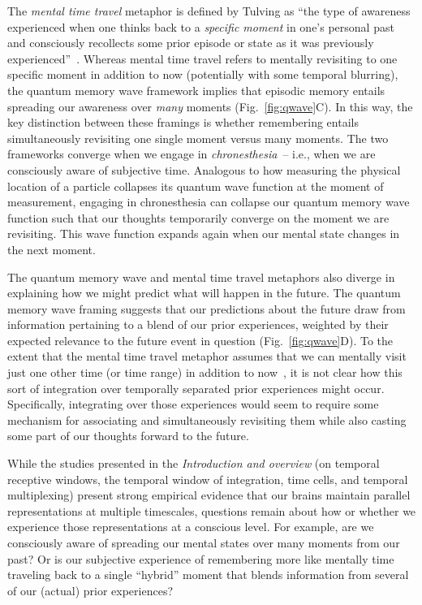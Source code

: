 \documentclass{article}
\begin{document}
The \textit{mental time travel} metaphor is defined by Tulving as ``the type of awareness experienced when one thinks back to a \textit{specific moment} in one's personal past and consciously recollects some prior episode or state as it was previously experienced''~\citep[Fig.~\ref{fig:qwave}B;][emphasis added]{WheeEtal97}.  Whereas mental time travel refers to mentally revisiting to one specific moment in addition to now (potentially with some temporal blurring), the quantum memory wave framework implies that episodic memory entails spreading our awareness over \textit{many} moments (Fig.~\ref{fig:qwave}C).  In this way, the key distinction between these framings is whether remembering entails simultaneously revisiting one single moment versus many moments.  The two frameworks converge when we engage in \textit{chronesthesia}~\citep{Tulv02b}-- i.e., when we are consciously aware of subjective time.   Analogous to how measuring the physical location of a particle collapses its quantum wave function at the moment of measurement, engaging in chronesthesia can collapse our quantum memory wave function such that our thoughts temporarily converge on the moment we are revisiting.  This wave function expands again when our mental state changes in the next moment.

The quantum memory wave and mental time travel metaphors also diverge in explaining how we might predict what will happen in the future.  The quantum memory wave framing suggests that our predictions about the future draw from information pertaining to a blend of our prior experiences, weighted by their expected relevance to the future event in question (Fig.~\ref{fig:qwave}D).  To the extent that the mental time travel metaphor assumes that we can mentally visit just one other time (or time range) in addition to now~\citep[e.g.,][]{SzpuTulv11}, it is not clear how this sort of integration over temporally separated prior experiences might occur.  Specifically, integrating over those experiences would seem to require some mechanism for associating and simultaneously revisiting them while also casting some part of our thoughts forward to the future.

While the studies presented in the \textit{Introduction and overview} (on temporal receptive windows, the temporal window of integration, time cells, and temporal multiplexing) present strong empirical evidence that our brains maintain parallel representations at multiple timescales, questions remain about how or whether we experience those representations at a conscious level.  For example, are we consciously aware of spreading our mental states over many moments from our past?  Or is our subjective experience of remembering more like mentally time traveling back to a single ``hybrid'' moment that blends information from several of our (actual) prior experiences?
\end{document}
